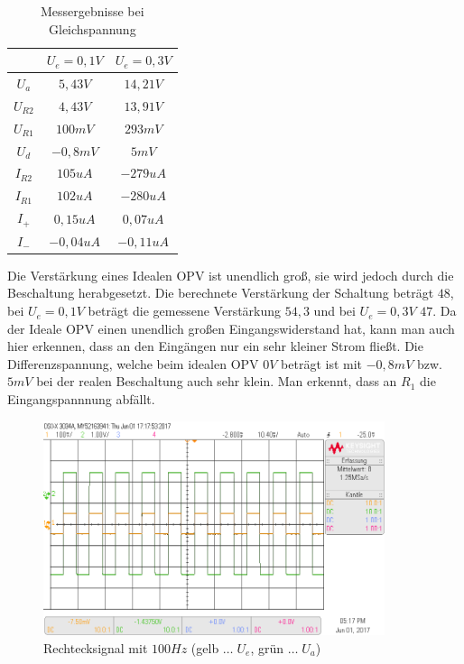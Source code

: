 \documentclass[12pt,a4paper,titlepage]{article}
\begin{document}
\begin{table}[H]
  \centering
  \begin{tabular}{c|c|c}
    & $U_e = 0,1V$ & $U_e = 0,3V$\\
    \hline
    $U_a$ & $5,43V$ & $14,21V$ \\
    \hline
    $U_{R2}$ & $4,43V$ & $13,91V$ \\
    \hline
    $U_{R1}$ & $100mV$ & $293mV$\\
    \hline
    $U_d$ & $-0,8mV$ & $5mV$ \\
    \hline
    $I_{R2}$ & $105uA$ & $-279uA$ \\
    \hline
    $I_{R1}$ & $102uA$ & $-280uA$ \\
    \hline
    $I_{+}$ & $0,15uA$ & $0,07uA$ \\
    \hline
    $I_{-}$ & $-0,04uA$ & $-0,11uA$ \\
  \end{tabular}
  \caption{Messergebnisse bei Gleichspannung}
\end{table}

\noindent Die Verstärkung eines Idealen OPV ist unendlich groß, sie wird jedoch durch die Beschaltung herabgesetzt. Die berechnete Verstärkung der Schaltung beträgt $48$, bei $U_e = 0,1V$ beträgt die gemessene Verstärkung $54,3$ und bei $U_e = 0,3V$ $47$. Da der Ideale OPV einen unendlich großen Eingangswiderstand hat, kann man auch hier erkennen, dass an den Eingängen nur ein sehr kleiner Strom fließt. Die Differenzspannung, welche beim idealen OPV $0V$ beträgt ist mit $-0,8mV$ bzw. $5mV$ bei der realen Beschaltung auch sehr klein. Man erkennt, dass an $R_1$ die Eingangspannnung abfällt. %

\begin{figure}[H]
  \centering
  \includegraphics[width=100mm]{scope_0.png}
  \caption{Rechtecksignal mit $100Hz$ (gelb $\hdots\;U_e$, grün $\hdots\;U_a$)}
\end{figure}
\end{document}
